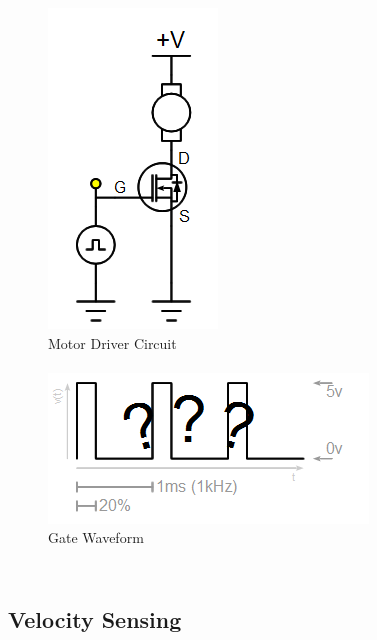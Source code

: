 \documentclass{beamer}
\begin{document}
\begin{frame}
\begin{columns}[t]
\begin{figure}
  \centering
  \includegraphics[scale=0.33]{images-dis3/driverckt-lowside} \\
  Motor Driver Circuit \\
  \hfill \\
  \includegraphics[width=1.0\columnwidth]{images-dis3/driverwave-questions} \\
  Gate Waveform
\end{figure}
\end{columns}
\end{frame}

\subsection{Velocity Sensing}
\end{document}
